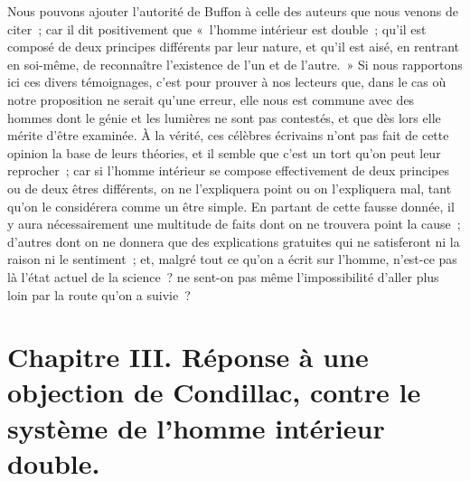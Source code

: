 \documentclass[french,twoside]{book} %
\newcommand\chapteropen{} %
\newcommand\chapterclose{} %
\begin{document}
Nous pouvons ajouter l’autorité de Buffon à celle des auteurs que nous venons de citer ; car il dit positivement que « l’homme intérieur est double ; qu’il est composé de deux principes différents par leur nature, et qu’il est aisé, en rentrant en soi-même, de reconnaître l’existence de l’un et de l’autre. » Si nous rapportons ici ces divers témoignages, c’est pour prouver à nos lecteurs que, dans le cas où notre proposition ne serait qu’une erreur, elle nous est commune avec des hommes dont le génie et les lumières ne sont pas contestés, et que dès lors elle mérite d’être examinée. À la vérité, ces célèbres écrivains n’ont pas fait de cette opinion la base de leurs théories, et il semble que c’est un tort qu’on peut leur reprocher ; car si l’homme intérieur se compose effectivement de deux principes ou de deux êtres différents, on ne l’expliquera point ou on l’expliquera mal, tant qu’on le considérera comme un être simple. En partant de cette fausse donnée, il y aura nécessairement une multitude de faits dont on ne trouvera point la cause ; d’autres dont on ne donnera que des explications gratuites qui ne satisferont ni la raison ni le sentiment ; et, malgré tout ce qu’on a écrit sur l’homme, n’est-ce pas là l’état actuel de la science ? ne sent-on pas même l’impossibilité d’aller plus loin par la route qu’on a suivie ?
\chapterclose


\chapteropen
\chapter[{Chapitre III. Réponse à une objection de Condillac, contre le système de l’homme intérieur double.}]{Chapitre III. Réponse à une objection de Condillac, contre le système de l’homme intérieur double.}\renewcommand{\leftmark}{Chapitre III. Réponse à une objection de Condillac, contre le système de l’homme intérieur double.}
\end{document}
